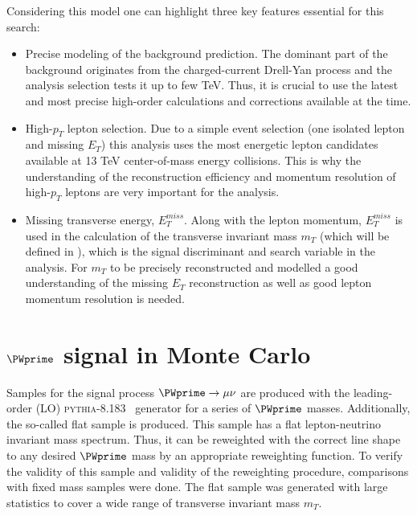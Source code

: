 Considering this model one can highlight three key features essential for this search:
\begin{itemize}
 \item Precise modeling of the background prediction. 
 The dominant part of the background originates from the charged-current Drell-Yan process and the analysis selection tests it up to few TeV.
 Thus, it is crucial to use the latest and most precise high-order calculations and corrections available at the time.
 \item High-$p_T$ lepton selection. Due to a simple event selection (one isolated lepton and missing $E_T$) 
 this analysis uses the most energetic lepton candidates available at 13 TeV center-of-mass energy collisions.
 This is why the understanding of the reconstruction efficiency and momentum resolution of high-$p_T$ leptons are very important for the analysis.
 \item Missing transverse energy, $E_T^{miss}$. Along with the lepton momentum, $E_T^{miss}$ is used in the calculation of the transverse invariant mass $m_T$ (which will be defined in ),
 which is the signal discriminant and search variable in the analysis. For $m_T$ to be precisely reconstructed and modelled a good understanding of the missing $E_T$ reconstruction as well as good lepton momentum resolution is needed.
\end{itemize}

\section{$\PWprime$ signal in Monte Carlo}
\label{sec:wprimeSignal} 

% 

Samples for the signal process $\PWprime \to \mu \nu$ are produced with the leading-order (LO) 
{\scshape pythia-8.183}~\cite{pythia8} generator for a series of $\PWprime$ masses. 
Additionally, the so-called flat sample is produced. This sample has a flat lepton-neutrino invariant mass spectrum.
Thus, it can be reweighted with the correct line shape to any desired $\PWprime$ mass by an appropriate reweighting function.
To verify the validity of this sample and validity of the reweighting procedure, comparisons with fixed mass samples were done.
The flat sample was generated with large statistics to cover
a wide range of transverse invariant mass $m_T$.


